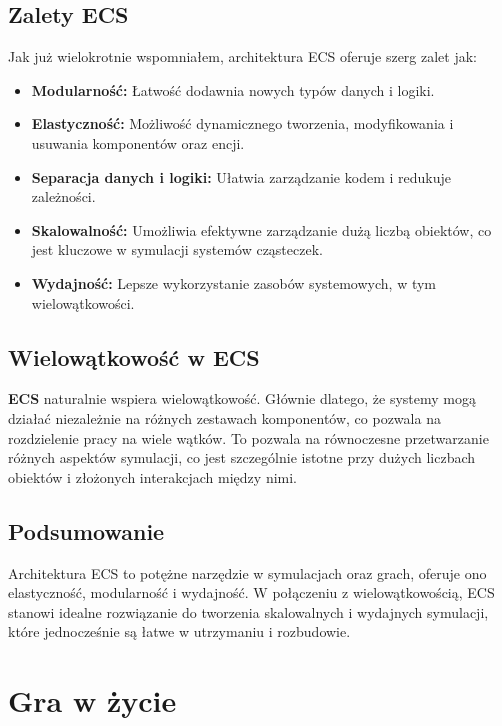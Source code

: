 \documentclass[11pt]{article}
\begin{document}
\subsection{Zalety ECS}
Jak już wielokrotnie wspomniałem, architektura ECS oferuje szerg zalet jak:
\begin{itemize}
    \item \textbf{Modularność:} Łatwość dodawnia nowych typów danych i logiki.
    \item \textbf{Elastyczność:} Możliwość dynamicznego tworzenia, modyfikowania i usuwania komponentów oraz encji.
    \item \textbf{Separacja danych i logiki:} Ułatwia zarządzanie kodem i redukuje zależności.
    \item \textbf{Skalowalność:} Umożliwia efektywne zarządzanie dużą liczbą obiektów, co jest kluczowe 
    w symulacji systemów cząsteczek.
    \item \textbf{Wydajność:} Lepsze wykorzystanie zasobów systemowych, w tym wielowątkowości.
\end{itemize}

\subsection{Wielowątkowość w ECS}
\textbf{ECS} naturalnie wspiera wielowątkowość. Głównie dlatego, że systemy mogą działać niezależnie na różnych zestawach
komponentów, co pozwala na rozdzielenie pracy na wiele wątków. To pozwala na równoczesne przetwarzanie różnych aspektów
symulacji, co jest szczególnie istotne przy dużych liczbach obiektów i złożonych interakcjach między nimi.

\subsection{Podsumowanie}
Architektura ECS to potężne narzędzie w symulacjach oraz grach, oferuje ono elastyczność, modularność i 
wydajność. W połączeniu z wielowątkowością, ECS stanowi idealne rozwiązanie do tworzenia
skalowalnych i wydajnych symulacji, które jednocześnie są łatwe w utrzymaniu i rozbudowie.

\section{Gra w życie}
\end{document}
